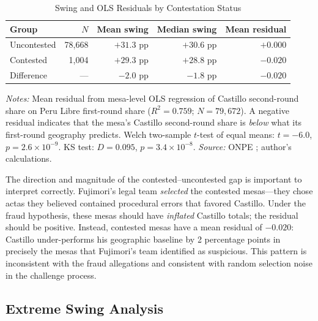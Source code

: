 \begin{table}[H]
\centering
\caption{Swing and OLS Residuals by Contestation Status}
\label{tab:a2_swing_status}
\begin{tabular}{lrrrr}
\toprule
Group & $N$ & Mean swing & Median swing & Mean residual \\
\midrule
Uncontested & 78,668 & $+31.3$ pp & $+30.6$ pp & $+0.000$ \\
Contested   &  1,004 & $+29.3$ pp & $+28.8$ pp & $-0.020$ \\
\midrule
Difference  & ---    & $-2.0$ pp  & $-1.8$ pp  & $-0.020$ \\
\bottomrule
\end{tabular}
\vspace{0.2cm}
\begin{minipage}{\textwidth}
\footnotesize
\textit{Notes:} Mean residual from mesa-level OLS regression of
Castillo second-round share on Peru Libre first-round share
($R^2 = 0.759$; $N = 79{,}672$).
A negative residual indicates that the mesa's Castillo second-round
share is \emph{below} what its first-round geography predicts.
Welch two-sample $t$-test of equal means:
$t = -6.0$, $p = 2.6 \times 10^{-9}$.
KS test: $D = 0.095$, $p = 3.4 \times 10^{-8}$.
\textit{Source:} ONPE \citep{onpe2021, onpe2021a}; author's calculations.
\end{minipage}
\end{table}

The direction and magnitude of the contested--uncontested gap is important
to interpret correctly. Fujimori's legal team \emph{selected} the contested
mesas---they chose actas they believed contained procedural errors that
favored Castillo. Under the fraud hypothesis, these mesas should have
\emph{inflated} Castillo totals; the residual should be positive. Instead,
contested mesas have a mean residual of $-0.020$: Castillo under-performs
his geographic baseline by 2 percentage points in precisely the mesas
that Fujimori's team identified as suspicious. This pattern is
inconsistent with the fraud allegations and consistent with random
selection noise in the challenge process.

\subsection{Extreme Swing Analysis}
\label{app:swing:extreme}

